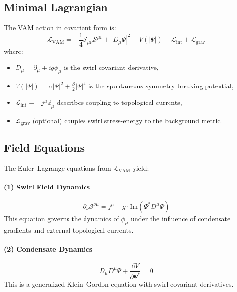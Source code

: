 \documentclass[a4paper,12pt]{article}
\begin{document}
        \subsection{Minimal Lagrangian}
        The VAM action in covariant form is:
        \begin{equation}
            \mathcal{L}_\text{VAM} = -\frac{1}{4} \mathcal{S}_{\mu\nu} \mathcal{S}^{\mu\nu} + |D_\mu \Psi|^2 - V(|\Psi|) + \mathcal{L}_{\text{int}} + \mathcal{L}_{\text{grav}}
        \end{equation}
        where:
        \begin{itemize}
            \item $D_\mu = \partial_\mu + i g \phi_\mu$ is the swirl covariant derivative,
            \item $V(|\Psi|) = \alpha |\Psi|^2 + \frac{\beta}{2} |\Psi|^4$ is the spontaneous symmetry breaking potential,
            \item $\mathcal{L}_{\text{int}} = -j^\mu \phi_\mu$ describes coupling to topological currents,
            \item $\mathcal{L}_{\text{grav}}$ (optional) couples swirl stress-energy to the background metric.
        \end{itemize}

        \subsection{Field Equations}
        The Euler--Lagrange equations from $\mathcal{L}_\text{VAM}$ yield:
        \paragraph{(1) Swirl Field Dynamics}
        \begin{equation}
            \partial_\nu \mathcal{S}^{\nu\mu} = j^\mu - g \cdot \mathrm{Im}(\Psi^* D^\mu \Psi)
        \end{equation}
        This equation governs the dynamics of $\phi_\mu$ under the influence of condensate gradients and external topological currents.

        \paragraph{(2) Condensate Dynamics}
        \begin{equation}
            D_\mu D^\mu \Psi + \frac{\partial V}{\partial \Psi^*} = 0
        \end{equation}
        This is a generalized Klein--Gordon equation with swirl covariant derivatives.
\end{document}
